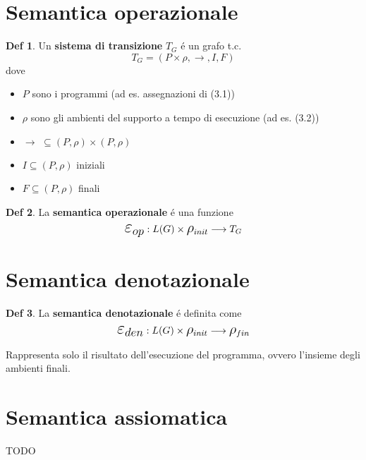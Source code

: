 \documentclass[a4paper]{report}
\theoremstyle{definition} \newtheorem*{defi}{Def}
\theoremstyle{plain} \newtheorem{lemma}{Lemma}
\theoremstyle{plain} \newtheorem{teo}{Teorema}
\theoremstyle{remark} \newtheorem*{es}{Esempio}
\begin{document}
\section{Semantica operazionale}
\begin{defi} 
Un {\bf sistema di transizione} $T_G$ \'e un grafo t.c.
$$
T_G = ( P \times \rho , \longrightarrow , I , F  )
$$
dove
\begin{itemize}
\item $P$ sono i programmi (ad es. assegnazioni di (3.1))
\item $\rho$ sono gli ambienti del supporto a tempo di esecuzione (ad es. (3.2))
\item $ \longrightarrow \, \, \subseteq ( P , \rho ) \times ( P , \rho ) $
\item $ I \subseteq ( P,\rho)$ iniziali
\item $ F \subseteq (P, \rho)$ finali
\end{itemize}
\end{defi}

\begin{defi}
La {\bf semantica operazionale} \'e una funzione 
$$
\mathlarger{\mathlarger{\mathlarger{\varepsilon_{op}}}} : L(G) \times \mathlarger{\mathlarger{\rho}}_{init} \longrightarrow T_G
$$ 
\end{defi}

\section{Semantica denotazionale}
\begin{defi}
La {\bf semantica denotazionale} \'e definita come
$$
\mathlarger{\mathlarger{\mathlarger{\varepsilon_{den}}}} : L(G) \times \mathlarger{\mathlarger{\rho}}_{init} \longrightarrow \mathlarger{\mathlarger{\rho}}_{fin}
$$
\end{defi}
Rappresenta solo il risultato dell'esecuzione del programma, ovvero l'insieme degli ambienti finali.

\section{Semantica assiomatica}
TODO
\end{document}
